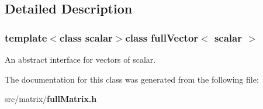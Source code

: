 \subsection{Detailed Description}
\subsubsection*{template$<$class scalar$>$class full\-Vector$<$ scalar $>$}

An abstract interface for vectors of scalar. 

The documentation for this class was generated from the following file\-:\begin{DoxyCompactItemize}
\item 
src/matrix/{\bf full\-Matrix.\-h}\end{DoxyCompactItemize}
